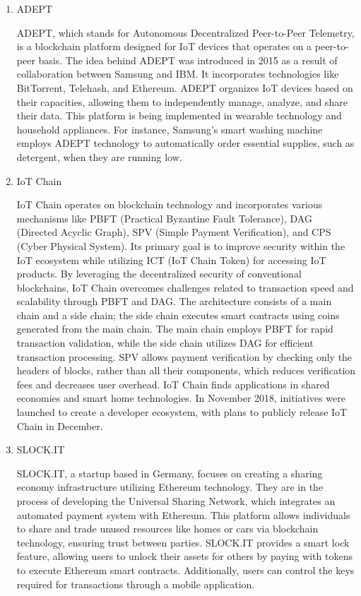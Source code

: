 \documentclass[conference]{IEEEtran}
\begin{document}
	\begin{enumerate}[itemsep=2ex, parsep=1ex]
		\item ADEPT

			ADEPT, which stands for Autonomous Decentralized Peer-to-Peer Telemetry,
			is a blockchain platform designed for IoT devices that operates on a peer-to-peer
			basis. The idea behind ADEPT was introduced in 2015 as a result of collaboration
			between Samsung and IBM. It incorporates technologies like BitTorrent, Telehash,
			and Ethereum. ADEPT organizes IoT devices based on their capacities,
			allowing them to independently manage, analyze, and share their data. This
			platform is being implemented in wearable technology and household appliances.
			For instance, Samsung's smart washing machine employs ADEPT technology to automatically
			order essential supplies, such as detergent, when they are running low.

		\item IoT Chain

			IoT Chain operates on blockchain technology and incorporates various
			mechanisms like PBFT (Practical Byzantine Fault Tolerance), DAG (Directed
			Acyclic Graph), SPV (Simple Payment Verification), and CPS (Cyber Physical
			System). Its primary goal is to improve security within the IoT ecosystem
			while utilizing ICT (IoT Chain Token) for accessing IoT products. By leveraging
			the decentralized security of conventional blockchains, IoT Chain
			overcomes challenges related to transaction speed and scalability through
			PBFT and DAG. The architecture consists of a main chain and a side chain;
			the side chain executes smart contracts using coins generated from the
			main chain. The main chain employs PBFT for rapid transaction validation,
			while the side chain utilizes DAG for efficient transaction processing. SPV
			allows payment verification by checking only the headers of blocks, rather
			than all their components, which reduces verification fees and decreases user
			overhead. IoT Chain finds applications in shared economies and smart home
			technologies. In November 2018, initiatives were launched to create a
			developer ecosystem, with plans to publicly release IoT Chain in December.

		\item SLOCK.IT

			SLOCK.IT, a startup based in Germany, focuses on creating a sharing
			economy infrastructure utilizing Ethereum technology. They are in the process
			of developing the Universal Sharing Network, which integrates an automated
			payment system with Ethereum. This platform allows individuals to share and
			trade unused resources like homes or cars via blockchain technology,
			ensuring trust between parties. SLOCK.IT provides a smart lock feature,
			allowing users to unlock their assets for others by paying with tokens to
			execute Ethereum smart contracts. Additionally, users can control the keys
			required for transactions through a mobile application.


\end{enumerate}
\end{document}
